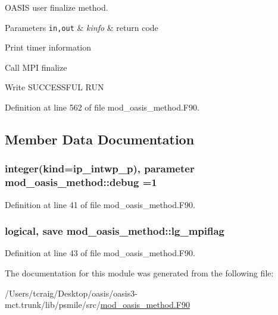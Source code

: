 O\+A\+S\+I\+S user finalize method. 


\begin{DoxyParams}[1]{Parameters}
\mbox{\tt in,out}  & {\em kinfo} & return code \\
\hline
\end{DoxyParams}

\begin{DoxyItemize}
\item Print timer information
\item Call M\+P\+I finalize
\item Write S\+U\+C\+C\+E\+S\+S\+F\+U\+L R\+U\+N 
\end{DoxyItemize}

Definition at line 562 of file mod\+\_\+oasis\+\_\+method.\+F90.



\subsection{Member Data Documentation}
\hypertarget{classmod__oasis__method_a390290b92b6af57b2732cb7521532f1c}{
\subsubsection[{debug}]{\setlength{\rightskip}{0pt plus 5cm}integer(kind=ip\+\_\+intwp\+\_\+p), parameter mod\+\_\+oasis\+\_\+method\+::debug =1\hspace{0.3cm}{\ttfamily [private]}}}\label{classmod__oasis__method_a390290b92b6af57b2732cb7521532f1c}


Definition at line 41 of file mod\+\_\+oasis\+\_\+method.\+F90.

\hypertarget{classmod__oasis__method_a2d387aae5e884be0aa69d640a7d3b49f}{
\subsubsection[{lg\+\_\+mpiflag}]{\setlength{\rightskip}{0pt plus 5cm}logical, save mod\+\_\+oasis\+\_\+method\+::lg\+\_\+mpiflag\hspace{0.3cm}{\ttfamily [private]}}}\label{classmod__oasis__method_a2d387aae5e884be0aa69d640a7d3b49f}


Definition at line 43 of file mod\+\_\+oasis\+\_\+method.\+F90.



The documentation for this module was generated from the following file\+:\begin{DoxyCompactItemize}
\item 
/\+Users/tcraig/\+Desktop/oasis/oasis3-\/mct.\+trunk/lib/psmile/src/\hyperlink{mod__oasis__method_8_f90}{mod\+\_\+oasis\+\_\+method.\+F90}\end{DoxyCompactItemize}
